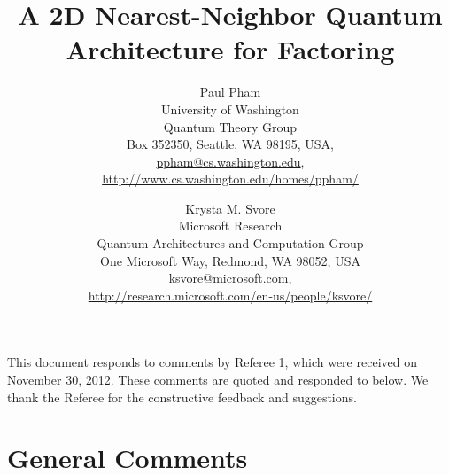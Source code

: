 \documentclass{article}
\newcommand{\email}[1]{\href{mailto:#1}{#1}}
\theoremstyle{plain} \newtheorem{lemma}{Lemma}
\begin{document}

\title{A 2D Nearest-Neighbor Quantum Architecture for Factoring}


%
%
\author{Paul Pham\\
University of Washington\\
Quantum Theory Group\\
Box 352350, Seattle, WA 98195, USA,\\
\email{ppham@cs.washington.edu},\\
\url{http://www.cs.washington.edu/homes/ppham/}
\and
Krysta M. Svore\\
Microsoft Research\\
Quantum Architectures and Computation Group\\
One Microsoft Way, Redmond, WA 98052, USA\\
\email{ksvore@microsoft.com},\\
\url{http://research.microsoft.com/en-us/people/ksvore/}
}

\maketitle

This document responds to comments by Referee 1, which were received on
November 30, 2012. These comments are quoted and responded to below.  We thank the Referee for the constructive feedback and suggestions.

\section{General Comments}
\end{document}
